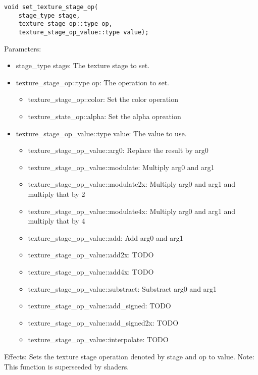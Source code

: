 \documentclass{article}
\begin{document}
\begin{lstlisting}
void set_texture_stage_op(
	stage_type stage,
	texture_stage_op::type op,
	texture_stage_op_value::type value);
\end{lstlisting}
Parameters:
\begin{itemize}
\item stage\_type stage: The texture stage to set.
\item texture\_stage\_op::type op: The operation to set.
  \begin{itemize}
  \item texture\_stage\_op::color: Set the color operation
  \item texture\_state\_op::alpha: Set the alpha opreation
  \end{itemize}
\item texture\_stage\_op\_value::type value: The value to use.
  \begin{itemize}
  \item texture\_stage\_op\_value::arg0: Replace the result by arg0
  \item texture\_stage\_op\_value::modulate: Multiply arg0 and arg1
  \item texture\_stage\_op\_value::modulate2x: Multiply arg0 and arg1 and multiply that by 2
  \item texture\_stage\_op\_value::modulate4x: Multiply arg0 and arg1 and multiply that by 4
  \item texture\_stage\_op\_value::add: Add arg0 and arg1
  \item texture\_stage\_op\_value::add2x: TODO
  \item texture\_stage\_op\_value::add4x: TODO
  \item texture\_stage\_op\_value::substract: Substract arg0 and arg1
  \item texture\_stage\_op\_value::add\_signed: TODO
  \item texture\_stage\_op\_value::add\_signed2x: TODO
  \item texture\_stage\_op\_value::interpolate: TODO
  \end{itemize}
\end{itemize}
Effects: Sets the texture stage operation denoted by stage and op to value.
Note: This function is superseeded by shaders.
\end{document}
